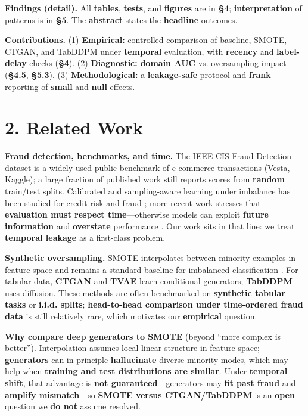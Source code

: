 \documentclass[sigconf]{acmart}
\begin{document}
{\textbf{Findings (detail).} All \textbf{tables}, \textbf{tests}, and \textbf{figures} are in \textbf{§4}; \textbf{interpretation} of patterns is in \textbf{§5}. The \textbf{abstract} states the \textbf{headline} outcomes.

\textbf{Contributions.} (1) \textbf{Empirical:} controlled comparison of baseline, SMOTE, CTGAN, and TabDDPM under \textbf{temporal} evaluation, with \textbf{recency} and \textbf{label-delay} checks (\textbf{§4}). (2) \textbf{Diagnostic:} \textbf{domain AUC} vs. oversampling impact (\textbf{§4.5}, \textbf{§5.3}). (3) \textbf{Methodological:} a \textbf{leakage-safe} protocol and \textbf{frank} reporting of \textbf{small} and \textbf{null} effects.


\section{2. Related Work}

\textbf{Fraud detection, benchmarks, and time.} The IEEE-CIS Fraud Detection dataset \cite{ref4} is a widely used public benchmark of e-commerce transactions (Vesta, Kaggle); a large fraction of published work still reports scores from \textbf{random} train/test splits. Calibrated and sampling-aware learning under imbalance has been studied for credit risk and fraud \cite{ref5}; more recent work stresses that \textbf{evaluation must respect time}—otherwise models can exploit \textbf{future information} and \textbf{overstate} performance \cite{ref6}. Our work sits in that line: we treat \textbf{temporal leakage} as a first-class problem.

\textbf{Synthetic oversampling.} SMOTE \cite{ref1} interpolates between minority examples in feature space and remains a standard baseline for imbalanced classification \cite{ref8}. For tabular data, \textbf{CTGAN} and \textbf{TVAE} \cite{ref2} learn conditional generators; \textbf{TabDDPM} \cite{ref3} uses diffusion. These methods are often benchmarked on \textbf{synthetic tabular tasks} or \textbf{i.i.d. splits}; \textbf{head-to-head comparison under time-ordered fraud data} is still relatively rare, which motivates our \textbf{empirical} question.

\textbf{Why compare deep generators to SMOTE} (beyond “more complex is better”). Interpolation assumes local linear structure in feature space; \textbf{generators} can in principle \textbf{hallucinate} diverse minority modes, which may help when \textbf{training and test distributions are similar}. Under \textbf{temporal shift}, that advantage is \textbf{not guaranteed}—generators may \textbf{fit past fraud} and \textbf{amplify mismatch}—so \textbf{SMOTE versus CTGAN/TabDDPM} is an \textbf{open} question we \textbf{do not} assume resolved.

}
\end{document}
